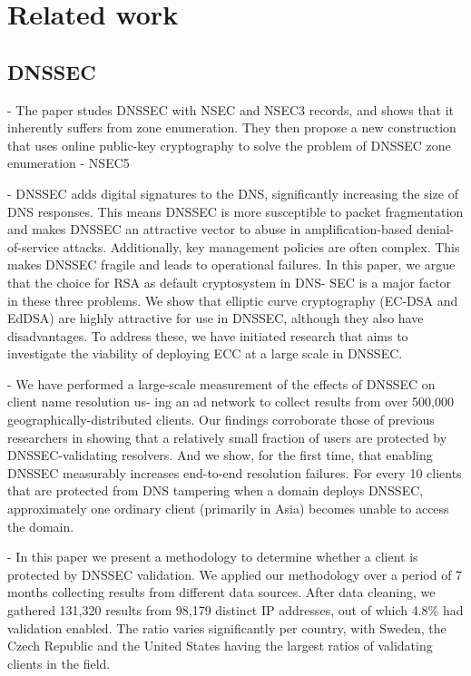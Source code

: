 \section{Related work}

\subsection{DNSSEC}
\cite{goldberg2015nsec5} - The paper studes DNSSEC with NSEC and NSEC3 records, and shows that it inherently suffers from zone enumeration. They then propose a new construction that uses online public-key cryptography to solve the problem of DNSSEC zone enumeration - NSEC5

\cite{van2015making} - DNSSEC adds digital signatures to the DNS, significantly increasing the size of DNS responses. This means DNSSEC is more susceptible to packet fragmentation and makes DNSSEC an attractive vector to abuse in amplification-based denial-of-service attacks. Additionally, key management policies are often complex. This makes DNSSEC fragile and leads to operational failures. In this paper, we argue that the choice for RSA as default cryptosystem in DNS- SEC is a major factor in these three problems. We show that  elliptic curve cryptography (EC-DSA and EdDSA) are highly attractive for use in DNSSEC, although they also have disadvantages. To address these, we have initiated research that aims to investigate the viability of deploying ECC at a large scale in DNSSEC.

\cite{lian2013measuring} - We have performed a large-scale measurement of the effects of DNSSEC on client name resolution us- ing an ad network to collect results from over 500,000 geographically-distributed clients. Our findings corroborate those of previous researchers in showing that a relatively small fraction of users are protected by DNSSEC-validating resolvers. And we show, for the first time, that enabling DNSSEC measurably increases end-to-end resolution failures. For every 10 clients that are protected from DNS tampering when a domain deploys DNSSEC, approximately one ordinary client (primarily in Asia) becomes unable to access the domain.

\cite{wander2013measuring} - In this paper we present a methodology to determine whether a client is protected by DNSSEC
validation. We applied our methodology over a period of 7 months collecting results from different data sources. After data cleaning, we gathered 131,320 results from 98,179 distinct IP addresses, out of which 4.8\% had validation enabled. The ratio varies significantly per country, with Sweden, the Czech Republic and the United States having the largest ratios of validating clients in the field.

